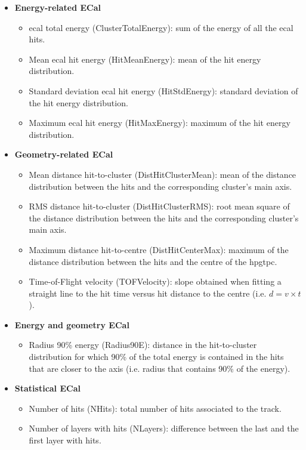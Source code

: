 \begin{itemize}
	\item \textbf{Energy-related ECal}
	\begin{itemize}
		\item \gls{ecal} total energy (ClusterTotalEnergy): sum of the energy of all the \gls{ecal} hits.
		\item Mean \gls{ecal} hit energy (HitMeanEnergy): mean of the hit energy distribution.
		\item Standard deviation \gls{ecal} hit energy (HitStdEnergy): standard deviation of the hit energy distribution.
		\item Maximum \gls{ecal} hit energy (HitMaxEnergy): maximum of the hit energy distribution.
	\end{itemize}
	\item \textbf{Geometry-related ECal}
	\begin{itemize}
		\item Mean distance hit-to-cluster (DistHitClusterMean): mean of the distance distribution between the hits and the corresponding cluster's main axis.
		\item RMS distance hit-to-cluster (DistHitClusterRMS): root mean square of the distance distribution between the hits and the corresponding cluster's main axis.
		\item Maximum distance hit-to-centre (DistHitCenterMax): maximum of the distance distribution between the hits and the centre of the \gls{hpgtpc}.
		\item Time-of-Flight velocity (TOFVelocity): slope obtained when fitting a straight line to the hit time versus hit distance to the centre (i.e. $d = v \times t$).
	\end{itemize}
	\item \textbf{Energy and geometry ECal}
	\begin{itemize}
		\item Radius 90\% energy (Radius90E): distance in the hit-to-cluster distribution for which 90\% of the total energy is contained in the hits that are closer to the axis (i.e. radius that contains 90\% of the energy).
	\end{itemize}
	\item \textbf{Statistical ECal}
	\begin{itemize}
		\item Number of hits (NHits): total number of hits associated to the track.
		\item Number of layers with hits (NLayers): difference between the last and the first layer with hits.
	\end{itemize}
\end{itemize}

